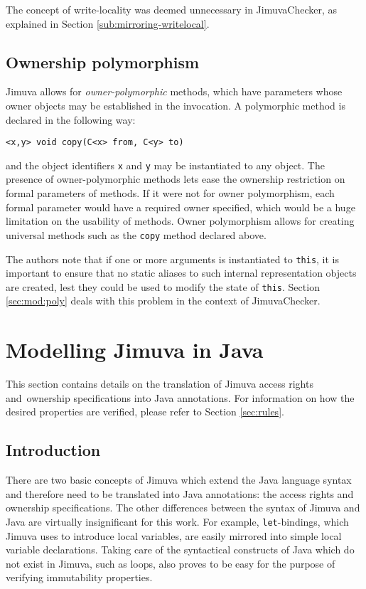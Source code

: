 \documentclass{pracamgr}
\theoremstyle{break}
\theoremstyle{break}
\theoremstyle{break}
\begin{document}
The concept of write-locality was deemed unnecessary in
JimuvaChecker, as explained in Section \ref{sub:mirroring-writelocal}.

\subsection{Ownership polymorphism}

\label{sec:jimuva:poly}

Jimuva allows for \emph{owner-polymorphic} methods, which have
parameters whose owner objects may be established in the invocation. A
polymorphic method is declared in the following way:
\begin{center}
  \texttt{<x,y> void copy(C<x> from, C<y> to)}
\end{center}
and the object identifiers \texttt{x} and \texttt{y} may be
instantiated to any object. The presence of owner-polymorphic methods
lets ease the ownership restriction on formal parameters of
methods. If it were not for owner polymorphism, each formal parameter
would have a required owner specified, which would be a huge
limitation on the usability of methods. Owner polymorphism allows for
creating universal methods such as the \texttt{copy} method declared
above.

The authors note that if one or more arguments is instantiated to
\texttt{this}, it is important to ensure that no static aliases to
such internal representation objects are created, lest they could be
used to modify the state of \texttt{this}. Section \ref{sec:mod:poly}
deals with this problem in the context of JimuvaChecker.

\section{Modelling Jimuva in Java}
\label{sec:modelling}

This section contains details on the translation of Jimuva access
rights and~ownership specifications into Java annotations. For
information on how the desired properties are verified, please refer
to Section \ref{sec:rules}.

\subsection{Introduction}

There are two basic concepts of Jimuva which extend the Java language
syntax and therefore need to be translated into Java annotations: the
access rights and ownership specifications. The other differences
between the syntax of Jimuva and Java are virtually insignificant for
this work. For example, \texttt{let}-bindings, which Jimuva uses to
introduce local variables, are easily mirrored into simple local
variable declarations. Taking care of the syntactical constructs of
Java which do not exist in Jimuva, such as loops, also proves to be
easy for the purpose of verifying immutability properties.
\end{document}
